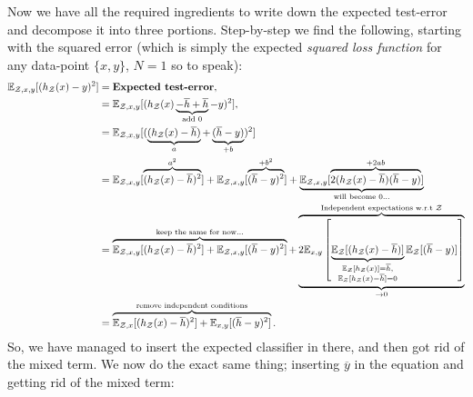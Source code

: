 \documentclass{article}
\begin{document}
Now we have all the required ingredients to write down the expected test-error and decompose it into three portions. Step-by-step we find the following, starting with the squared error (which is simply the expected \textit{squared loss function} for any data-point $\{x,y\}$, $N=1$ so to speak):
\begin{align}
    \mathbb{E}_{\mathcal{Z},x,y}[(h_\mathcal{Z}(x)-y)^2] & = \text{\textbf{Expected test-error}},\\
    & = \mathbb{E}_{\mathcal{Z},x,y}[(h_\mathcal{Z}(x) \underbrace{- \overline{h} + \overline{h}}_\text{add 0} - y)^2],\\
    & = \mathbb{E}_{\mathcal{Z},x,y}[(\underbrace{(h_\mathcal{Z}(x) - \overline{h})}_{a} + \underbrace{(\overline{h} - y)}_{+b})^2]\\
    & = \mathbb{E}_{\mathcal{Z},x,y}[\overbrace{(h_\mathcal{Z}(x) - \overline{h})^2}^{a^2}] + \mathbb{E}_{\mathcal{Z},x,y}[\overbrace{(\overline{h} - y)^2}^{+b^2}] + \underbrace{\mathbb{E}_{\mathcal{Z},x,y}[\overbrace{2(h_\mathcal{Z}(x) - \overline{h})(\overline{h} - y)}^{+2ab}]}_\text{will become 0...}\\
    & = \overbrace{
            \mathbb{E}_{\mathcal{Z},x,y}[(h_\mathcal{Z}(x) - \overline{h})^2] + \mathbb{E}_{\mathcal{Z},x,y}[(\overline{h} - y)^2]
        }^\text{keep the same for now...}+ 
        \underbrace{\overbrace{
            2\mathbb{E}_{x,y}\left[
                \underbrace{\mathbb{E}_{\mathcal{Z}}[(h_\mathcal{Z}(x) - \overline{h})]}_{\substack{\mathbb{E}_\mathcal{Z}[h_\mathcal{Z}(x)]=\overline{h},\\\mathbb{E}_\mathcal{Z}[h_\mathcal{Z}(x)-\overline{h}]=0}}
            \mathbb{E}_{\mathcal{Z}}[(\overline{h} - y)]\right]}^\text{Independent expectations w.r.t $\mathcal{Z}$}}_{\to 0}\\
    & = \overbrace{\mathbb{E}_{\mathcal{Z},x}[(h_\mathcal{Z}(x) - \overline{h})^2] + \mathbb{E}_{x,y}[(\overline{h} - y)^2]}^\text{remove independent conditions}.
\end{align}
So, we have managed to insert the expected classifier in there, and then got rid of the mixed term. We now do the exact same thing; inserting $\overline{y}$ in the equation and getting rid of the mixed term:
\end{document}
